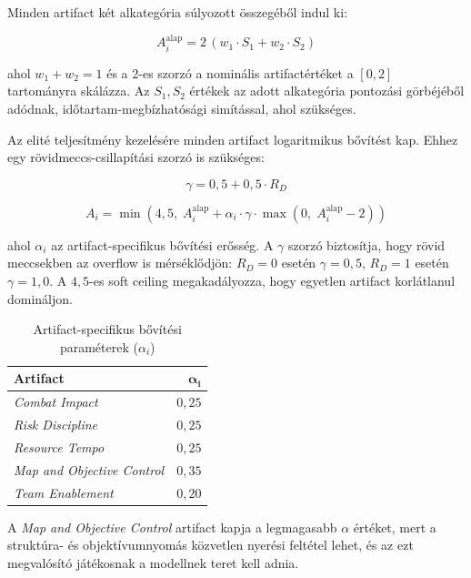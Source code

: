 Minden artifact két alkategória súlyozott összegéből indul ki:

\begin{equation}
A_i^{\text{alap}} = 2\,(w_1 \cdot S_1 + w_2 \cdot S_2)
\end{equation}

ahol $w_1 + w_2 = 1$ és a $2$-es szorzó a nominális artifactértéket a $[0, 2]$ tartományra skálázza. Az $S_1, S_2$ értékek az adott alkategória pontozási görbéjéből adódnak, időtartam-megbízhatósági simítással, ahol szükséges.

Az elité teljesítmény kezelésére minden artifact logaritmikus bővítést kap. Ehhez egy rövidmeccs-csillapítási szorzó is szükséges:

\begin{equation}
\gamma = 0{,}5 + 0{,}5 \cdot R_D
\end{equation}

\begin{equation}
A_i = \min\!\left(4{,}5,\; A_i^{\text{alap}} + \alpha_i \cdot \gamma \cdot \max\!\left(0,\; A_i^{\text{alap}} - 2\right)\right)
\end{equation}

ahol $\alpha_i$ az artifact-specifikus bővítési erősség. A $\gamma$ szorzó biztosítja, hogy rövid meccsekben az overflow is mérséklődjön: $R_D = 0$ esetén $\gamma = 0{,}5$, $R_D = 1$ esetén $\gamma = 1{,}0$. A $4{,}5$-es soft ceiling megakadályozza, hogy egyetlen artifact korlátlanul domináljon.

\begin{table}[H]
\centering
\caption{Artifact-specifikus bővítési paraméterek ($\alpha_i$)}
\label{tab:overflow_params}
\begin{tabular}{lr}
\toprule
\textbf{Artifact} & $\boldsymbol{\alpha_i}$ \\
\midrule
\textit{Combat Impact}             & $0{,}25$ \\
\textit{Risk Discipline}           & $0{,}25$ \\
\textit{Resource Tempo}            & $0{,}25$ \\
\textit{Map and Objective Control} & $0{,}35$ \\
\textit{Team Enablement}           & $0{,}20$ \\
\bottomrule
\end{tabular}
\end{table}

A \textit{Map and Objective Control} artifact kapja a legmagasabb $\alpha$ értéket, mert a struktúra- és objektívumnyomás közvetlen nyerési feltétel lehet, és az ezt megvalósító játékosnak a modellnek teret kell adnia.

